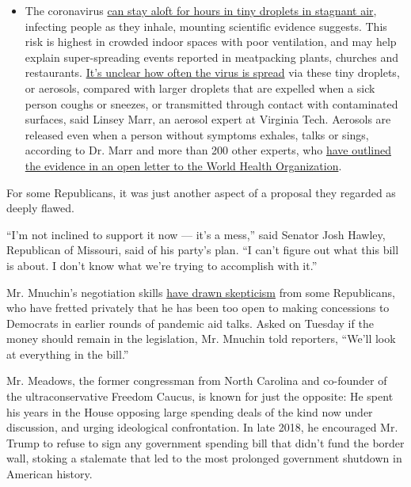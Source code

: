\begin{itemize}
  \begin{itemize}
  \tightlist
  \item
    The coronavirus
    \href{https://www.nytimes.com/2020/07/04/health/239-experts-with-one-big-claim-the-coronavirus-is-airborne.html?action=click\&pgtype=Article\&state=default\&region=MAIN_CONTENT_3\&context=storylines_faq}{can
    stay aloft for hours in tiny droplets in stagnant air}, infecting
    people as they inhale, mounting scientific evidence suggests. This
    risk is highest in crowded indoor spaces with poor ventilation, and
    may help explain super-spreading events reported in meatpacking
    plants, churches and restaurants.
    \href{https://www.nytimes.com/2020/07/06/health/coronavirus-airborne-aerosols.html?action=click\&pgtype=Article\&state=default\&region=MAIN_CONTENT_3\&context=storylines_faq}{It's
    unclear how often the virus is spread} via these tiny droplets, or
    aerosols, compared with larger droplets that are expelled when a
    sick person coughs or sneezes, or transmitted through contact with
    contaminated surfaces, said Linsey Marr, an aerosol expert at
    Virginia Tech. Aerosols are released even when a person without
    symptoms exhales, talks or sings, according to Dr. Marr and more
    than 200 other experts, who
    \href{https://academic.oup.com/cid/article/doi/10.1093/cid/ciaa939/5867798}{have
    outlined the evidence in an open letter to the World Health
    Organization}.
  \end{itemize}
\end{itemize}

For some Republicans, it was just another aspect of a proposal they
regarded as deeply flawed.

``I'm not inclined to support it now --- it's a mess,'' said Senator
Josh Hawley, Republican of Missouri, said of his party's plan. ``I can't
figure out what this bill is about. I don't know what we're trying to
accomplish with it.''

Mr. Mnuchin's negotiation skills
\href{https://www.nytimes.com/2020/04/17/us/politics/coronavirus-mnuchin-republicans.html}{have
drawn skepticism} from some Republicans, who have fretted privately that
he has been too open to making concessions to Democrats in earlier
rounds of pandemic aid talks. Asked on Tuesday if the money should
remain in the legislation, Mr. Mnuchin told reporters, ``We'll look at
everything in the bill.''

Mr. Meadows, the former congressman from North Carolina and co-founder
of the ultraconservative Freedom Caucus, is known for just the opposite:
He spent his years in the House opposing large spending deals of the
kind now under discussion, and urging ideological confrontation. In late
2018, he encouraged Mr. Trump to refuse to sign any government spending
bill that didn't fund the border wall, stoking a stalemate that led to
the most prolonged government shutdown in American history.

